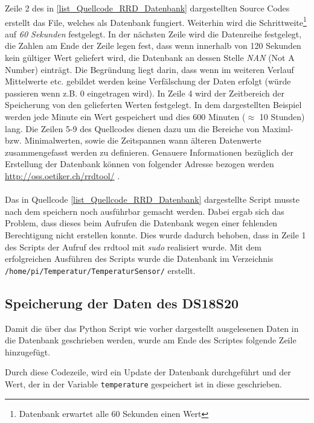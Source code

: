 Zeile 2 des in \ref{list_Quellcode_RRD_Datenbank} dargestellten Source Codes erstellt das File, welches als Datenbank fungiert. Weiterhin wird die Schrittweite\footnote{Datenbank erwartet alle 60 Sekunden einen Wert} auf \textit{60 Sekunden} festgelegt. In der nächsten Zeile wird die Datenreihe festgelegt, die Zahlen am Ende der Zeile legen fest, dass wenn innerhalb von 120 Sekunden kein gültiger Wert geliefert wird, die Datenbank an dessen Stelle \textit{NAN} (Not A Number) einträgt. Die Begründung liegt darin, dass wenn im weiteren Verlauf Mittelwerte etc. gebildet werden keine Verfälschung der Daten erfolgt (würde passieren wenn z.B. 0 eingetragen wird). In Zeile 4 wird der Zeitbereich der Speicherung von den gelieferten Werten festgelegt. In dem dargestellten Beispiel werden jede Minute ein Wert gespeichert und dies 600 Minuten ($\approx$ 10 Stunden) lang. Die Zeilen 5-9 des Quellcodes dienen dazu um die Bereiche von Maximl- bzw. Minimalwerten, sowie die Zeitspannen wann älteren Datenwerte zusammengefasst werden zu definieren. Genauere Informationen bezüglich der Erstellung der Datenbank können von folgender Adresse bezogen werden \url{http://oss.oetiker.ch/rrdtool/} \citep{Hompage_RRDtool}.\\\\
Das in Quellcode \ref{list_Quellcode_RRD_Datenbank} dargestellte Script musste nach dem speichern noch ausführbar gemacht werden. Dabei ergab sich das Problem, dass dieses beim Aufrufen die Datenbank wegen einer fehlenden Berechtigung nicht erstellen konnte. Dies wurde dadurch behoben, dass in Zeile 1 des Scripts der Aufruf des rrdtool mit \textit{sudo} realisiert wurde. Mit dem erfolgreichen Ausführen des Scripts wurde die Datenbank im Verzeichnis \texttt{/home/pi/Temperatur/TemperaturSensor/} erstellt.

\subsection*{Speicherung der Daten des DS18S20}
\label{subsection_Speicherung der Daten des DS18S20}
Damit die über das Python Script wie vorher dargestellt ausgelesenen Daten in die Datenbank geschrieben werden, wurde am Ende des Scriptes folgende Zeile hinzugefügt.



Durch diese Codezeile, wird ein Update der Datenbank durchgeführt und der Wert, der in der Variable \texttt{temperature} gespeichert ist in diese geschrieben.
\newpage

